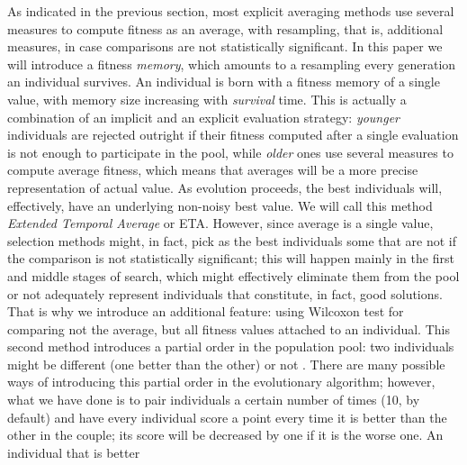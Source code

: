 \documentclass{llncs}
\begin{document}
As indicated in the previous section, 
most explicit averaging methods
use several measures to compute fitness as an average, with
resampling, that is, additional measures, in case 
comparisons are not
statistically significant. In this paper we will introduce a fitness
{\em memory}, which amounts 
to a resampling every generation an
individual survives. An individual is born with a fitness
memory of a single value, with memory size increasing with {\em
  survival} time. This is actually a combination of an implicit and an 
explicit evaluation strategy: {\em younger} individuals are rejected
outright if their fitness computed after a single evaluation is not
enough to participate in the pool, while  {\em older} ones use several
measures to compute average fitness, which means that averages will be
a more precise representation of actual value. 
As evolution proceeds,
the best individuals will, effectively, have an underlying non-noisy
best value. We will call this method {\em Extended Temporal Average}
or {\sf ETA}. 
However, since average is a single value, selection methods might, in
fact, pick as the best individuals some that are not if the comparison
is not statistically significant; this will happen mainly in the first
and middle stages of search, which might effectively eliminate them from
the pool 
or not adequately represent individuals that constitute, in
fact, good solutions. That is why we introduce an additional feature:
using Wilcoxon test \cite{wilcoxon:1945}
for comparing not the average, but all
fitness values attached to an individual. This second method
introduces a partial order in the population pool: two individuals
might be different (one better than the other) or not \cite{wilcoxon:ga}. There are many
possible ways of introducing this partial order in the evolutionary
algorithm; however, what we have done is to pair individuals a certain
number of times (10, by default) and have every individual score a
point every time it is better than the other in the couple; its score
will be decreased by one if it is the worse one. An individual that is better
\end{document}
